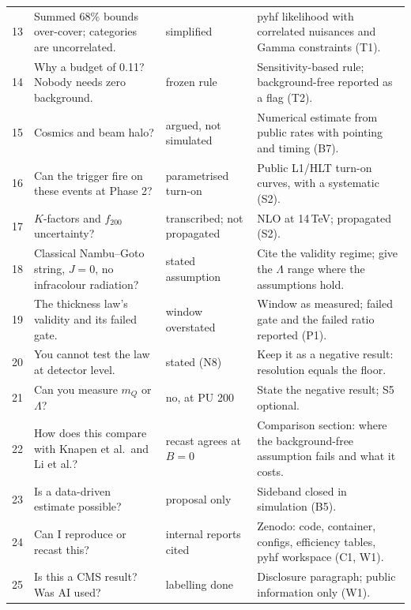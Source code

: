 \documentclass[11pt,a4paper]{article}
\begin{document}
\begin{longtable}{@{}P{4mm}P{54mm}P{36mm}P{56mm}@{}}
13 & Summed 68\% bounds over-cover; categories are uncorrelated. & simplified & pyhf likelihood with correlated nuisances and Gamma constraints (T1).\\
14 & Why a budget of 0.11? Nobody needs zero background. & frozen rule & Sensitivity-based rule; background-free reported as a flag (T2).\\
15 & Cosmics and beam halo? & argued, not simulated & Numerical estimate from public rates with pointing and timing (B7).\\
16 & Can the trigger fire on these events at Phase 2? & parametrised turn-on & Public L1/HLT turn-on curves, with a systematic (S2).\\
17 & $K$-factors and $f_{200}$ uncertainty? & transcribed; not propagated & NLO at 14\,TeV; propagated (S2).\\
18 & Classical Nambu--Goto string, $J=0$, no infracolour radiation? & stated assumption & Cite the validity regime; give the $\Lambda$ range where the assumptions hold.\\
19 & The thickness law's validity and its failed gate. & window overstated & Window as measured; failed gate and the failed ratio reported (P1).\\
20 & You cannot test the law at detector level. & stated (N8) & Keep it as a negative result: resolution equals the floor.\\
21 & Can you measure $m_Q$ or $\Lambda$? & no, at PU 200 & State the negative result; S5 optional.\\
22 & How does this compare with Knapen et al.\ and Li et al.? & recast agrees at $B=0$ & Comparison section: where the background-free assumption fails and what it costs.\\
23 & Is a data-driven estimate possible? & proposal only & Sideband closed in simulation (B5).\\
24 & Can I reproduce or recast this? & internal reports cited & Zenodo: code, container, configs, efficiency tables, pyhf workspace (C1, W1).\\
25 & Is this a CMS result? Was AI used? & labelling done & Disclosure paragraph; public information only (W1).\\
\bottomrule
\end{longtable}
\normalsize

\end{document}
